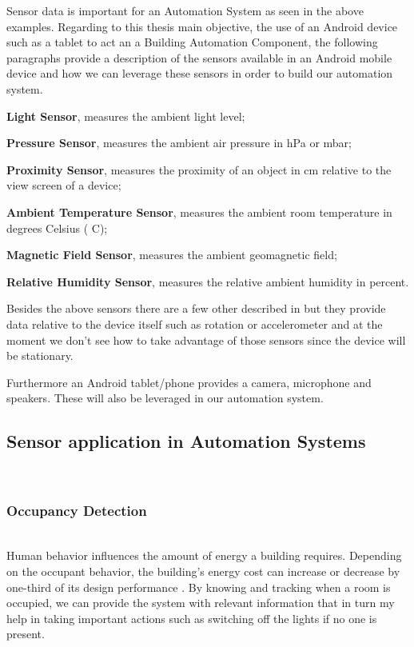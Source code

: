 Sensor data is important for an Automation System as seen in the above examples. Regarding to this thesis main objective, the use of an Android device such as a tablet to act an a Building Automation Component, the following paragraphs provide a description of the sensors available in an Android mobile device \cite{android:sensors} and how we can leverage these sensors in order to build our automation system.

\textbf{Light Sensor}, measures the ambient light level;

\textbf{Pressure Sensor}, measures the ambient air pressure in hPa or mbar;

\textbf{Proximity Sensor}, measures the proximity of an object in cm relative to the view screen of a device;

\textbf{Ambient Temperature Sensor}, measures the ambient room temperature in degrees Celsius ( C);

\textbf{Magnetic Field Sensor}, measures the ambient geomagnetic field;

\textbf{Relative Humidity Sensor}, measures the relative ambient humidity in percent.

Besides the above sensors there are a few other described in \cite{android:sensors} but they provide data relative to the device itself such as rotation or accelerometer and at the moment we don't see how to take advantage of those sensors since the device will be stationary.

Furthermore an Android tablet/phone provides a camera, microphone and speakers. These will also be leveraged in our automation system.



\subsection{Sensor application in Automation Systems}\mbox{}\\

\subsubsection{Occupancy Detection}\label{ocupacy_detection}\mbox{}\\

Human behavior influences the amount of energy a building requires. Depending on the occupant behavior, the building's energy cost can increase or decrease by one-third of its design performance \cite{ocupancy2}. 
By knowing and tracking when a room is occupied, we can provide the system with relevant information that in turn my help in taking important actions such as switching off the lights if no one is present. 

